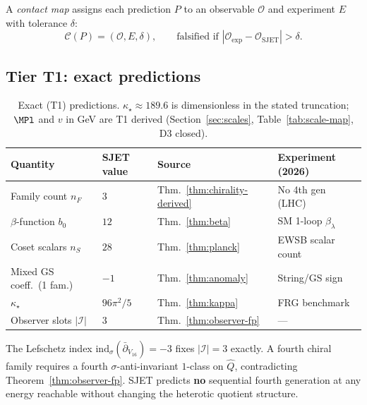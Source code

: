 \begin{definition}\label{def:contact-map}
A \emph{contact map} assigns each prediction $P$ to an observable $\mathcal{O}$
and experiment $E$ with tolerance $\delta$:
\begin{equation}\label{eq:contact}
  \mathcal{C}(P)=(\mathcal{O},E,\delta),
  \qquad
  \text{falsified if }|\mathcal{O}_{\mathrm{exp}}-\mathcal{O}_{\mathrm{SJET}}|>\delta.
\end{equation}
\end{definition}

\subsection{Tier T1: exact predictions}
\label{sec:predictions:T1}

\begin{table}[ht]
\centering
\small
\renewcommand{\arraystretch}{1.1}
\begin{tabular}{@{}llll@{}}
\toprule
\textbf{Quantity} & \textbf{SJET value} & \textbf{Source} & \textbf{Experiment (2026)} \\
\midrule
Family count $n_F$ & $3$ & Thm.~\ref{thm:chirality-derived} & No 4th gen (LHC) \\
$\beta$-function $b_0$ & $12$ & Thm.~\ref{thm:beta} & SM 1-loop $\beta_\lambda$ \\
Coset scalars $n_S$ & $28$ & Thm.~\ref{thm:planck} & EWSB scalar count \\
Mixed GS coeff.\ (1 fam.) & $-1$ & Thm.~\ref{thm:anomaly} & String/GS sign \\
$\kappa_\star$ & $96\pi^2/5$ & Thm.~\ref{thm:kappa} & FRG benchmark \\
Observer slots $|\mathcal{I}|$ & $3$ & Thm.~\ref{thm:observer-fp} & --- \\
\bottomrule
\end{tabular}
\caption{Exact (T1) predictions. $\kappa_\star\approx189.6$ is dimensionless in
the stated truncation; $\MPl$ and $v$ in GeV are T1 derived
(Section~\ref{sec:scales}, Table~\ref{tab:scale-map}, D3 closed).}
\label{tab:predictions-T1}
\end{table}

\begin{proposition}\label{prop:no-fourth}
The Lefschetz index $\mathrm{ind}_\sigma(\bar\partial_{V_{16}})=-3$ fixes
$|\mathcal{I}|=3$ exactly. A fourth chiral family requires a fourth
$\sigma$-anti-invariant $1$-class on $\hat Q$, contradicting
Theorem~\ref{thm:observer-fp}. SJET predicts \textbf{no} sequential fourth
generation at any energy reachable without changing the heterotic quotient
structure.
\end{proposition}

